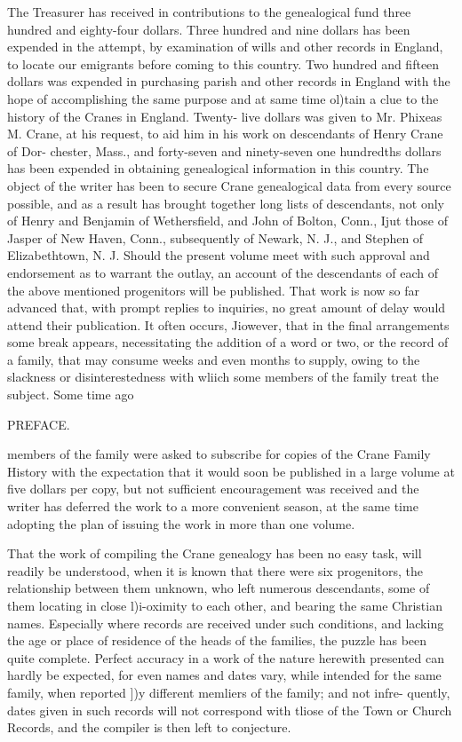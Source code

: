 \documentclass{book}
\begin{document}
The Treasurer has received in contributions to the genealogical 
fund three hundred and eighty-four dollars. Three hundred and 
nine dollars has been expended in the attempt, by examination of 
wills and other records in England, to locate our emigrants before 
coming to this country. Two hundred and fifteen dollars was 
expended in purchasing parish and other records in England with 
the hope of accomplishing the same purpose and at same time 
ol)tain a clue to the history of the Cranes in England. Twenty- 
live dollars was given to Mr. Phixeas M. Crane, at his request, 
to aid him in his work on descendants of Henry Crane of Dor- 
chester, Mass., and forty-seven and ninety-seven one hundredths 
dollars has been expended in obtaining genealogical information 
in this country. The object of the writer has been to secure 
Crane genealogical data from every source possible, and as a 
result has brought together long lists of descendants, not only of 
Henry and Benjamin of Wethersfield, and John of Bolton, 
Conn., Ijut those of Jasper of New Haven, Conn., subsequently 
of Newark, N. J., and Stephen of Elizabethtown, N. J. Should 
the present volume meet with such approval and endorsement as 
to warrant the outlay, an account of the descendants of each of 
the above mentioned progenitors will be published. That work 
is now so far advanced that, with prompt replies to inquiries, no 
great amount of delay would attend their publication. It often 
occurs, Jiowever, that in the final arrangements some break 
appears, necessitating the addition of a word or two, or the 
record of a family, that may consume weeks and even months to 
supply, owing to the slackness or disinterestedness with wliich 
some members of the family treat the subject. Some time ago 



PREFACE. 



members of the family were asked to subscribe for copies of the 
Crane Family History with the expectation that it would soon 
be published in a large volume at five dollars per copy, but not 
sufficient encouragement was received and the writer has deferred 
the work to a more convenient season, at the same time adopting 
the plan of issuing the work in more than one volume. 

That the work of compiling the Crane genealogy has been no 
easy task, will readily be understood, when it is known that there 
were six progenitors, the relationship between them unknown, 
who left numerous descendants, some of them locating in close 
l)i-oximity to each other, and bearing the same Christian names. 
Especially where records are received under such conditions, and 
lacking the age or place of residence of the heads of the families, 
the puzzle has been quite complete. Perfect accuracy in a work 
of the nature herewith presented can hardly be expected, for even 
names and dates vary, while intended for the same family, when 
reported ])y different memliers of the family; and not infre- 
quently, dates given in such records will not correspond with 
tliose of the Town or Church Records, and the compiler is then 
left to conjecture. 
\end{document}
